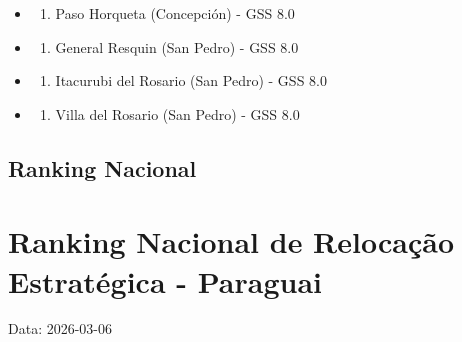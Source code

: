 \begin{itemize}
  \begin{enumerate}
  \def\labelenumi{\arabic{enumi}.}
  \setcounter{enumi}{15}
  \tightlist
  \item
    Fuerte Olimpo (Alto Paraguay) - GSS 8.1
  \end{enumerate}
\item
  \begin{enumerate}
  \def\labelenumi{\arabic{enumi}.}
  \setcounter{enumi}{16}
  \tightlist
  \item
    Paso Horqueta (Concepción) - GSS 8.0
  \end{enumerate}
\item
  \begin{enumerate}
  \def\labelenumi{\arabic{enumi}.}
  \setcounter{enumi}{17}
  \tightlist
  \item
    General Resquin (San Pedro) - GSS 8.0
  \end{enumerate}
\item
  \begin{enumerate}
  \def\labelenumi{\arabic{enumi}.}
  \setcounter{enumi}{18}
  \tightlist
  \item
    Itacurubi del Rosario (San Pedro) - GSS 8.0
  \end{enumerate}
\item
  \begin{enumerate}
  \def\labelenumi{\arabic{enumi}.}
  \setcounter{enumi}{19}
  \tightlist
  \item
    Villa del Rosario (San Pedro) - GSS 8.0
  \end{enumerate}
\end{itemize}
\subsection{Ranking Nacional}\label{ranking-nacional}

\section{Ranking Nacional de Relocação Estratégica - Paraguai}\label{ranking-nacional-de-relocauxe7uxe3o-estratuxe9gica---paraguai}

Data: 2026-03-06

